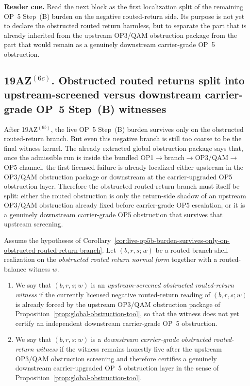 \noindent\textbf{Reader cue.} Read the next block as the first localization split of the remaining OP~5 Step~(B) burden on the negative routed-return side. Its purpose is not yet to declare the obstructed routed return harmless, but to separate the part that is already inherited from the upstream OP3/QAM obstruction package from the part that would remain as a genuinely downstream carrier-grade OP~5 obstruction.

\subsection*{19AZ$^{(6c)}$. Obstructed routed returns split into upstream-screened versus downstream carrier-grade OP~5 Step~(B) witnesses}
\label{sec:obstructed-routed-returns-split-upstream-screened-vs-downstream-carrier-grade-op5b}
After 19AZ$^{(6b)}$, the live OP~5 Step~(B) burden survives only on the obstructed routed-return branch. But even this negative branch is still too coarse to be the final witness kernel. The already extracted global obstruction package says that, once the admissible run is inside the bundled OP1$\to$branch$\to$OP3/QAM$\to$OP5 channel, the first licensed failure is already localized either upstream in the OP3/QAM obstruction package or downstream at the carrier-upgraded OP5 obstruction layer. Therefore the obstructed routed-return branch must itself be split: either the routed obstruction is only the return-side shadow of an upstream OP3/QAM obstruction already fixed before carrier-grade OP5 escalation, or it is a genuinely downstream carrier-grade OP5 obstruction that survives that upstream screening.

\begin{definition}
\label{def:upstream-screened-vs-downstream-carrier-grade-obstructed-routed-return-witness}
Assume the hypotheses of Corollary~\ref{cor:live-op5b-burden-survives-only-on-obstructed-routed-return-branch}. Let $(b,r,s;w)$ be a routed branch-shell realization on the \emph{obstructed routed return normal form} together with a routed-balance witness \(w\).
\begin{enumerate}[leftmargin=2em,label=(\roman*)]
\item We say that $(b,r,s;w)$ is an \emph{upstream-screened obstructed routed-return witness} if the currently licensed negative routed-return reading of $(b,r,s;w)$ is already forced by the upstream OP3/QAM obstruction package of Proposition~\ref{prop:global-obstruction-tool}, so that the witness does not yet certify an independent downstream carrier-grade OP~5 obstruction.
\item We say that $(b,r,s;w)$ is a \emph{downstream carrier-grade obstructed routed-return witness} if the witness remains honestly live after the upstream OP3/QAM obstruction screening and therefore certifies a genuinely downstream carrier-upgraded OP~5 obstruction layer in the sense of Proposition~\ref{prop:global-obstruction-tool}.
\end{enumerate}
\end{definition}


